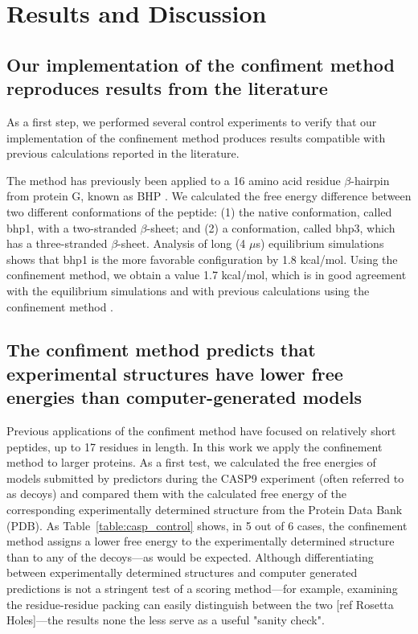 \documentclass[12pt]{article}
\begin{document}
\section{Results and Discussion}

\subsection{Our implementation of the confiment method reproduces results from the literature}

As a first step, we performed several control experiments to verify that our implementation of the
confinement method produces results compatible with previous calculations reported in the
literature.

The method has previously been applied to a 16 amino acid residue $\beta$-hairpin from protein G,
known as BHP \cite{Cecchini2009}. We calculated the free energy difference between two different
conformations of the peptide: (1) the native conformation, called bhp1, with a two-stranded
$\beta$-sheet; and (2) a conformation, called bhp3, which has a three-stranded $\beta$-sheet.
Analysis of long (4 $\mu$s) equilibrium simulations \cite{Cecchini2009,Krivov2004}  shows that bhp1
is the more favorable configuration by 1.8 kcal/mol. Using the confinement method, we obtain a value
1.7 kcal/mol, which is in good agreement with the equilibrium simulations and with previous
calculations using the confinement method \cite{Cecchini2009}.

\subsection{The confiment method predicts that experimental structures have lower free energies than
computer-generated models}

Previous applications of the confiment method have focused on relatively short peptides, up to 17
residues in length. In this work we apply the confinement method to larger proteins. As a first
test, we calculated the free energies of models submitted by predictors during the CASP9 experiment
(often referred to as decoys) and compared them with the calculated free energy of the corresponding
experimentally determined structure from the Protein Data Bank (PDB). As
Table~\ref{table:casp_control} shows, in 5 out of 6 cases, the confinement method assigns a lower
free energy to the experimentally determined structure than to any of the decoys---as would be
expected. Although differentiating between experimentally determined structures and computer
generated predictions is not a stringent test of a scoring method---for example, examining the
residue-residue packing can easily distinguish between the two [ref Rosetta Holes]---the results
none the less serve as a useful "sanity check".
\end{document}
